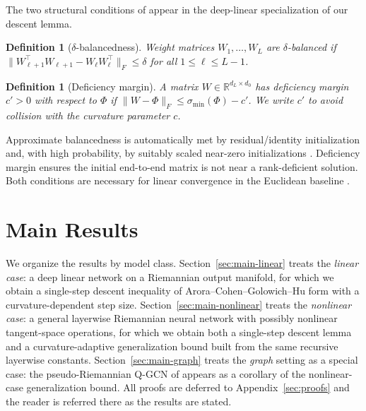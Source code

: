 \documentclass[letterpaper]{article}
\newcommand{\R}{\mathbb{R}}
\newtheorem{definition}[theorem]{Definition}
\begin{document}
The two structural conditions of \cite{arora2018convergence} appear in the
deep-linear specialization of our descent lemma.

\begin{definition}[$\delta$-balancedness]
\label{def:balanced}
Weight matrices $W_1, \ldots, W_L$ are \emph{$\delta$-balanced} if
$\|W_{\ell+1}^\top W_{\ell+1} - W_\ell W_\ell^\top\|_F \leq \delta$ for all
$1 \leq \ell \leq L-1$.
\end{definition}

\begin{definition}[Deficiency margin]
\label{def:defmargin}
A matrix $W \in \R^{d_L \times d_0}$ has \emph{deficiency margin $c' > 0$}
with respect to $\Phi$ if $\|W - \Phi\|_F \leq \sigma_{\min}(\Phi) - c'$.
We write $c'$ to avoid collision with the curvature parameter $c$.
\end{definition}

Approximate balancedness is automatically met by residual/identity
initialization and, with high probability, by suitably scaled near-zero
initializations \cite{arora2018convergence}. Deficiency margin ensures the
initial end-to-end matrix is not near a rank-deficient solution. Both
conditions are necessary for linear convergence in the Euclidean baseline
\cite[Appendix~C]{arora2018convergence}.


\section{Main Results}
\label{sec:main}

We organize the results by model class. Section~\ref{sec:main-linear}
treats the \emph{linear case}: a deep linear network on a Riemannian
output manifold, for which we obtain a single-step descent inequality of
Arora--Cohen--Golowich--Hu form with a curvature-dependent step size.
Section~\ref{sec:main-nonlinear} treats the \emph{nonlinear case}: a
general layerwise Riemannian neural network with possibly nonlinear
tangent-space operations, for which we obtain both a single-step descent
lemma and a curvature-adaptive generalization bound built from the same
recursive layerwise constants.
Section~\ref{sec:main-graph} treats the \emph{graph} setting as a
special case: the pseudo-Riemannian Q-GCN of \cite{xiong2022pseudo}
appears as a corollary of the nonlinear-case generalization bound.
All proofs are deferred to Appendix~\ref{sec:proofs} and the reader is
referred there as the results are stated.
\end{document}

